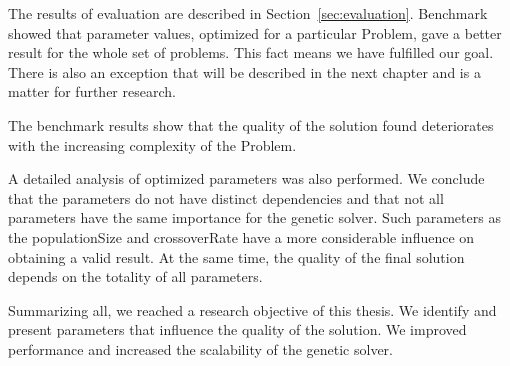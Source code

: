 The results of evaluation are described in Section~\ref{sec:evaluation}.
Benchmark showed that parameter values, optimized for a particular Problem, gave a better result for the whole set of problems. This fact means we have fulfilled our goal. There is also an exception that will be described in the next chapter and is a matter for further research.

The benchmark results show that the quality of the solution found deteriorates with the increasing complexity of the Problem.

A detailed analysis of optimized parameters was also performed. We conclude that the parameters do not have distinct dependencies and that not all parameters have the same importance for the genetic solver. Such parameters as the populationSize and crossoverRate have a more considerable influence on obtaining a valid result. At the same time, the quality of the final solution depends on the totality of all parameters.

Summarizing all, we reached a research objective of this thesis. We identify and present parameters that influence the quality of the solution. We improved performance and increased the scalability of the genetic solver.
